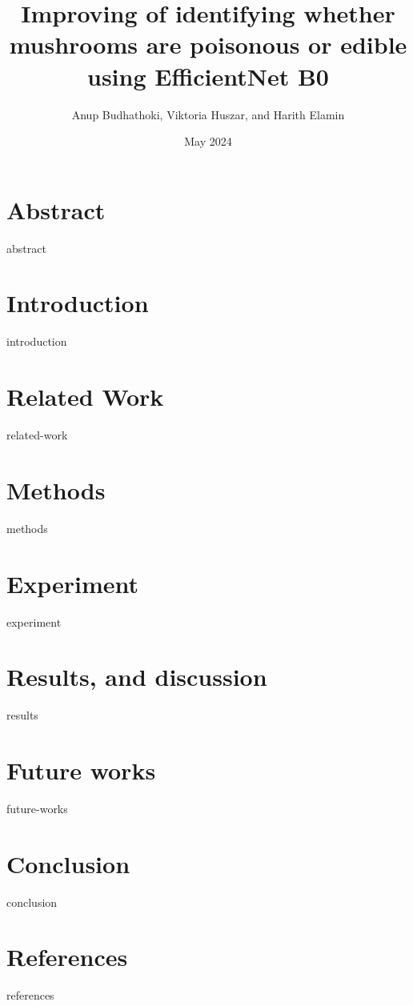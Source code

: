 \documentclass{article}
\title{Improving of identifying whether mushrooms are poisonous or edible using EfficientNet B0}
\author{ Anup Budhathoki, Viktoria Huszar, and Harith Elamin}
\affil{Department of Computer Science, Oslo metropolitan university, Norway}
\date{May 2024}
\begin{document}
\maketitle

\begin{multicols}{2}
\section{Abstract}
{abstract}
\section{Introduction}
{introduction}
\section{Related Work}
{related-work}
\section{Methods}
{methods}
\section{Experiment}
{experiment}
\section{Results, and discussion}
{results}
\section{Future works}
{future-works}
\section{Conclusion}
{conclusion}
\section{References}
{references}
\end{multicols}
\end{document}
